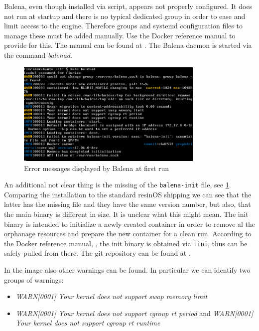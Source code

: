 \documentclass[]{scrartcl}
\begin{document}
Balena, even though installed via script, appears not properly configured. It does not run at startup and there is no typical dedicated group in order to ease and limit access to the engine.
Therefore groups and systemd configuration files to manage these must be added manually. Use the Docker reference manual to provide for this. The manual can be found at \cite{docker02}. The Balena daemon is started via the command \textit{balenad}.

\begin{figure}[t]
	\centering
	\includegraphics[width=0.8\textwidth]{balena-err}
	\caption{Error messages displayed by Balena at first run}
	\label{fig:balenad}
\end{figure}

An additional not clear thing is the missing of the \texttt{balena-init} file, see \ref{fig:balenad}. Comparing the installation to the standard resinOS shipping we can see that the latter has the missing file and they have the same version number, but also, that the main binary is different in size. It is unclear what this might mean. The init binary is intended to initialize a newly created container in order to remove al the orphanage resources and prepare the new container for a clean run. According to the Docker reference manual, \cite{docker03}, the init binary is obtained via \texttt{tini}, thus can be safely pulled from there. The git repository can be found at \cite{tini01}.

In the image also other warnings can be found. In particular we can identify two groups of warnings:

\begin{itemize}
	\item \textit{WARN[0001] Your kernel does not support swap memory limit}

	\item \textit{WARN[0001] Your kernel does not support cgroup rt period} and \textit{WARN[0001] Your kernel does not support cgroup rt runtime} 
\end{itemize}
\end{document}
